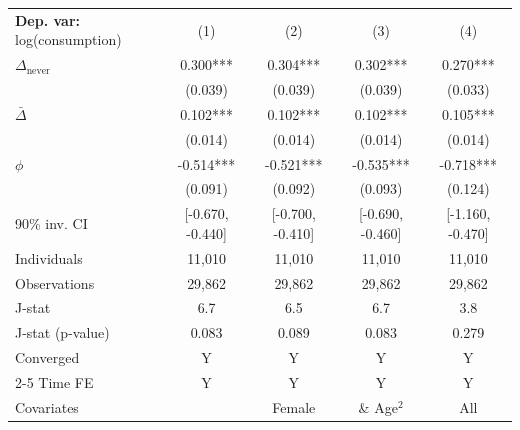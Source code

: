 \begin{tabular}{l cccc} \toprule  \textbf{Dep. var:}  log(consumption) 
                    &\multicolumn{1}{c}{(1)}   &\multicolumn{1}{c}{(2)}   &\multicolumn{1}{c}{(3)}   &\multicolumn{1}{c}{(4)}   \\

\addlinespace
$\Delta_{\text{never}}$&       0.300***&       0.304***&       0.302***&       0.270***\\
                    &     (0.039)   &     (0.039)   &     (0.039)   &     (0.033)   \\

\addlinespace
$\bar{\Delta}$      &       0.102***&       0.102***&       0.102***&       0.105***\\
                    &     (0.014)   &     (0.014)   &     (0.014)   &     (0.014)   \\

\addlinespace
$\phi$              &      -0.514***&      -0.521***&      -0.535***&      -0.718***\\
                    &     (0.091)   &     (0.092)   &     (0.093)   &     (0.124)   \\
90\% inv. CI        &[-0.670, -0.440]   &[-0.700, -0.410]   &[-0.690, -0.460]   &[-1.160, -0.470]   \\
Individuals         &      11,010   &      11,010   &      11,010   &      11,010   \\
Observations        &      29,862   &      29,862   &      29,862   &      29,862   \\
J-stat              &         6.7   &         6.5   &         6.7   &         3.8   \\
J-stat (p-value)    &       0.083   &       0.089   &       0.083   &       0.279   \\
Converged           &           Y   &           Y   &           Y   &           Y   \\
\cmidrule{2-5} Time FE & Y & Y & Y & Y \\ Covariates & & Female & \& Age$^2$ & All \\ \bottomrule \end{tabular}
